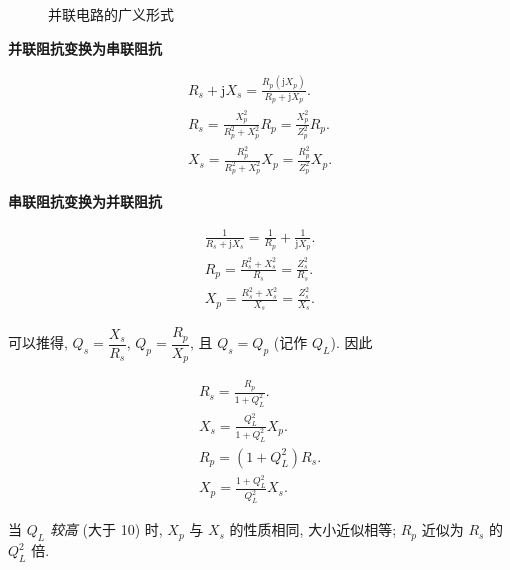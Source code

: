 \begin{figure}[H]
\begin{minipage}{.45\textwidth}
        \centering
        \caption{并联电路的广义形式}
    \end{minipage}
\end{figure}

\textbf{并联阻抗变换为串联阻抗}

\begin{gather}
    \nonumber R_s+\mathrm{j}X_s=\frac{R_p(\mathrm{j}X_p)}{R_p+\mathrm{j}X_p}. \\
    R_s=\frac{X_p^2}{R_p^2+X_p^2}R_p=\frac{X_p^2}{Z_p^2}R_p. \\
    X_s=\frac{R_p^2}{R_p^2+X_p^2}X_p=\frac{R_p^2}{Z_p^2}X_p.
\end{gather}

\textbf{串联阻抗变换为并联阻抗}

\begin{gather}
    \nonumber \frac{1}{R_s+\mathrm{j}X_s}=\frac{1}{R_p}+\frac{1}{\mathrm{j}X_p}. \\
    R_p=\frac{R_s^2+X_s^2}{R_s}=\frac{Z_s^2}{R_s}. \\
    X_p=\frac{R_s^2+X_s^2}{X_s}=\frac{Z_s^2}{X_s}.
\end{gather}

可以推得, $Q_s=\dfrac{X_s}{R_s}$, $Q_p=\dfrac{R_p}{X_p}$, 且 $Q_s=Q_p$ (记作 $Q_L$). 因此

\begin{gather}
    R_s=\frac{R_p}{1+Q_L^2}. \\
    X_s=\frac{Q_L^2}{1+Q_L^2}X_p. \\
    R_p=(1+Q_L^2)R_s. \\
    X_p=\frac{1+Q_L^2}{Q_L^2}X_s.
\end{gather}

当 $Q_L$ \textit{较高} (大于 10) 时, $X_p$ 与 $X_s$ 的性质相同, 大小近似相等; $R_p$ 近似为 $R_s$ 的 $Q_L^2$ 倍.

